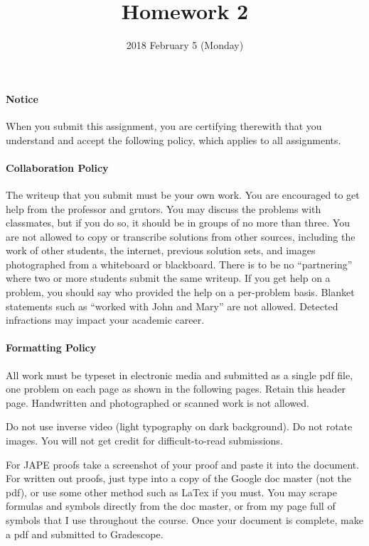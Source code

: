 \documentclass{cs81-homework}
\title{Homework 2}
\author{}
\date{2018 February 5 (Monday)}
\begin{document}
\begin{introduction}
  
  \paragraph{Notice}
  When you submit this assignment, you are certifying therewith
  that you understand and accept the following policy, which applies to all
  assignments.

  \paragraph{Collaboration Policy}
  The writeup that you submit must be your own work. You are encouraged to get
  help from the professor and grutors. You may discuss the problems with
  classmates, but if you do so, it should be in groups of no more than three. You
  are not allowed to copy or transcribe solutions from other sources, including
  the work of other students, the internet, previous solution sets, and images
  photographed from a whiteboard or blackboard. There is to be no “partnering”
  where two or more students submit the same writeup. If you get help on a
  problem, you should say who provided the help on a per-problem basis. Blanket
  statements such as “worked with John and Mary” are not allowed. Detected
  infractions may impact your academic career.

  \paragraph{Formatting Policy}
  All work must be typeset in electronic media and submitted as a single pdf file,
  one problem on each page as shown in the following pages. Retain this header
  page. Handwritten and photographed or scanned work is not allowed.

  Do not use inverse video (light typography on dark background). Do not rotate
  images.  You will not get credit for difficult-to-read submissions.

  For JAPE proofs take a screenshot of your proof and paste it into the
  document. For written out proofs, just type into a copy of the Google doc master
  (not the pdf), or use some other method such as LaTex if you must. You may
  scrape formulas and symbols directly from the doc master, or from my page full
  of symbols that I use throughout the course. Once your document is complete,
  make a pdf and submitted to Gradescope.

\end{introduction}
\end{document}
